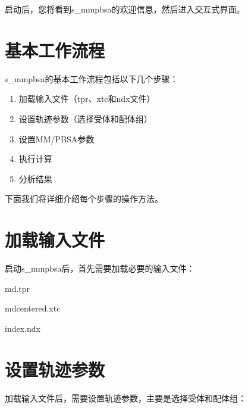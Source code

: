 \documentclass[letterpaper,10pt,english]{sphinxmanual}
\begin{document}
\sphinxAtStartPar
启动后，您将看到s\_mmpbsa的欢迎信息，然后进入交互式界面。


\section{基本工作流程}
\label{\detokenize{quick_start:id2}}
\sphinxAtStartPar
s\_mmpbsa的基本工作流程包括以下几个步骤：
\begin{enumerate}
%
\item {} 
\sphinxAtStartPar
加载输入文件（tpr、xtc和ndx文件）

\item {} 
\sphinxAtStartPar
设置轨迹参数（选择受体和配体组）

\item {} 
\sphinxAtStartPar
设置MM/PB\sphinxhyphen{}SA参数

\item {} 
\sphinxAtStartPar
执行计算

\item {} 
\sphinxAtStartPar
分析结果

\end{enumerate}

\sphinxAtStartPar
下面我们将详细介绍每个步骤的操作方法。


\section{加载输入文件}
\label{\detokenize{quick_start:id3}}
\sphinxAtStartPar
启动s\_mmpbsa后，首先需要加载必要的输入文件：

\begin{sphinxVerbatim}[commandchars=\\\{\}]
md.tpr

md\PYGZus{}centered.xtc

index.ndx

\end{sphinxVerbatim}


\section{设置轨迹参数}
\label{\detokenize{quick_start:id4}}
\sphinxAtStartPar
加载输入文件后，需要设置轨迹参数，主要是选择受体和配体组：
\end{document}
